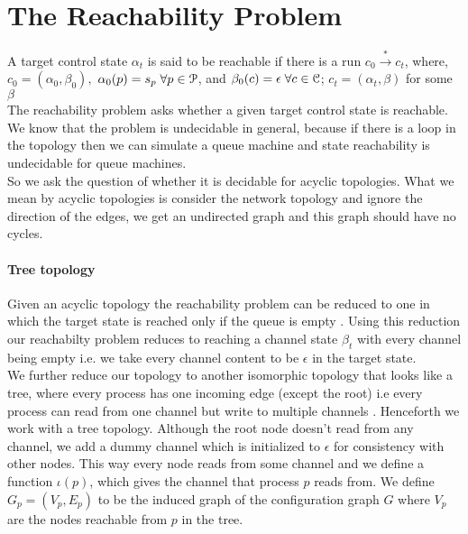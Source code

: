 \documentclass[a4paper,UKenglish,cleveref, autoref, thm-restate]{lipics-v2019}
\begin{document}
\section{The Reachability Problem}
\hspace*{0.5cm}A target control state $\alpha_t$ is said to be reachable if there is a run $c_0 \xrightarrow{*} c_t$, where, $c_0 = (\alpha_0, \beta_0),$  $\alpha_0(p)= s_p \hspace{1mm}\forall p \in \mathcal{P}$, and $\beta_0(c) = \epsilon \hspace{1mm} \forall c \in \mathcal{C}$; $c_t = (\alpha_t, \beta)$ for some $\beta$ \\
\hspace*{0.5cm}The reachability problem asks whether a given target control state is reachable. We know that the problem is undecidable in general, because if there is a loop in the topology then we can simulate a queue machine and state reachability is undecidable for queue machines. \\
\hspace*{0.5cm}So we ask the question of whether it is decidable for acyclic topologies.
What we mean by acyclic topologies is consider the network topology and ignore the direction of the edges, we get an undirected graph and this graph should have no cycles. 

\paragraph*{Tree topology}

\hspace*{0.5cm}Given an acyclic topology the reachability problem can be reduced to one in which the target state is reached only if the queue is empty \cite{CQS}. Using this reduction our reachabilty problem reduces to reaching a channel state $\beta_t$ with every channel being empty i.e. we take every channel content to be $\epsilon$ in the target state.\\
\hspace*{0.5cm}We further reduce our topology to another isomorphic topology that looks like a tree, where every process has one incoming edge (except the root) i.e every process can read from one channel but write to multiple channels \cite{CQS}. Henceforth we work with a tree topology. Although the root node doesn't read from any channel, we add a dummy channel which is initialized to $\epsilon$ for consistency with other nodes. This way every node reads from some channel and we define a function $\iota(p)$, which gives the channel that process $p$ reads from. We define $G_p = (V_p, E_p)$ to be the induced graph of the configuration graph $G$ where $V_p$ are the nodes reachable from $p$ in the tree. 
\end{document}
